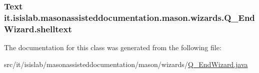 \hypertarget{classit_1_1isislab_1_1masonassisteddocumentation_1_1mason_1_1wizards_1_1_q___end_wizard_ac5e6042df131960cc6061862b2a7b8ce}{
\subsubsection[{shelltext}]{\setlength{\rightskip}{0pt plus 5cm}Text it.\-isislab.\-masonassisteddocumentation.\-mason.\-wizards.\-Q\-\_\-\-End\-Wizard.\-shelltext\hspace{0.3cm}{\ttfamily [private]}}}\label{classit_1_1isislab_1_1masonassisteddocumentation_1_1mason_1_1wizards_1_1_q___end_wizard_ac5e6042df131960cc6061862b2a7b8ce}


The documentation for this class was generated from the following file\-:\begin{DoxyCompactItemize}
\item 
src/it/isislab/masonassisteddocumentation/mason/wizards/\hyperlink{_q___end_wizard_8java}{Q\-\_\-\-End\-Wizard.\-java}\end{DoxyCompactItemize}
